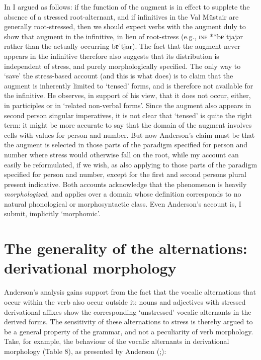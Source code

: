 \documentclass[output=paper,
modfonts
]{LSP/langsci}
\begin{document}
In \citet{maiden2011a} I argued as follows: if the function of the augment is
in effect to supplete the absence of a stressed root-alternant, and if
infinitives in the Val Müstair are generally root-stressed, then we
should expect verbs with the augment duly to show that augment in the
infinitive, in lieu of root-stress (e.g., \textsc{inf} **bɐˈtjajər
rather than the actually occurring bɐˈtjar). The fact that the augment
never appears in the infinitive therefore also suggests that its
distribution is independent of stress, and purely morphologically
specified. The only way to `save' the stress-based account (and this is
what \citealt{anderson2013stem} does) is to claim that the augment is inherently
limited to `tensed' forms, and is therefore not available for the
infinitive. He observes, in support of his view, that it does not occur,
either, in participles or in `related non-verbal forms'. Since the
augment also appears in second person singular imperatives, it is not
clear that `tensed' is quite the right term: it might be more accurate
to say that the domain of the augment involves cells with values for
person and number. But now Anderson's claim must be that the augment is
selected in those parts of the paradigm specified for person and number
where stress would otherwise fall on the root, while my account can
easily be reformulated, if we wish, as also applying to those parts of
the paradigm specified for person and number, except for the first and
second persons plural present indicative. Both accounts acknowledge that
the phenomenon is heavily \emph{morphologized}, and applies over a
domain whose definition corresponds to no natural phonological or
morphosyntactic class. Even Anderson's account is, I submit, implicitly
`morphomic'.

\section{The generality of the alternations: derivational
morphology}\label{the-generality-of-the-alternations-derivational-morphology}

Anderson's analysis gains support from the fact that the vocalic
alternations that occur within the verb also occur outside it: nouns and
adjectives with stressed derivational affixes show the corresponding
`unstressed' vocalic alternants in the derived forms. The sensitivity of
these alternations to stress is thereby argued to be a general property
of the grammar, and not a peculiarity of verb morphology. Take, for
example, the behaviour of the vocalic alternants in derivational
morphology (Table 8), as presented by Anderson (\citeyear[28--30]{anderson2011a};\citeyear[13--17]{anderson2013stem}):
\end{document}
